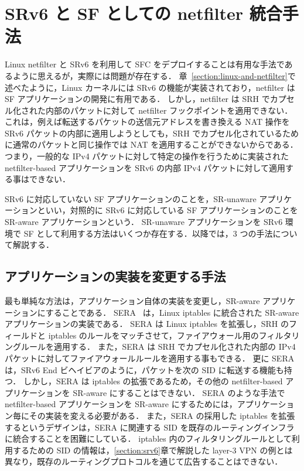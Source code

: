 \section{SRv6 と SF としての netfilter 統合手法}
\label{section:netfilter-as-nf}
Linux netfilter と SRv6 を利用して SFC をデプロイすることは有用な手法であるように思えるが，実際には問題が存在する．
章~\ref*{section:linux-and-netfilter}で述べたように，Linux カーネルには SRv6 の機能が実装されており，netfilter は SF アプリケーションの開発に有用である．
しかし，netfilter は SRH でカプセル化された内部のパケットに対して netfilter フックポイントを適用できない．
これは，例えば転送するパケットの送信元アドレスを書き換える NAT 操作を SRv6 パケットの内部に適用しようとしても，SRH でカプセル化されているために通常のパケットと同じ操作では NAT を適用することができないからである．
つまり，一般的な IPv4 パケットに対して特定の操作を行うために実装された netfilter-based アプリケーションを SRv6 の内部 IPv4 パケットに対して適用する事はできない．

SRv6 に対応していない SF アプリケーションのことを，SR-unaware アプリケーションといい，対照的に SRv6 に対応している SF アプリケーションのことを SR-aware アプリケーションという．
SR-unaware アプリケーションを SRv6 環境で SF として利用する方法はいくつか存在する．以降では，3 つの手法について解説する．

\subsection*{アプリケーションの実装を変更する手法}
\label{sbsection:change-impl}
最も単純な方法は，アプリケーション自体の実装を変更し，SR-aware アプリケーションにすることである．
SERA~\cite{sera} は，Linux iptables に統合された SR-aware アプリケーションの実装である．
SERA は Linux iptables を拡張し，SRH のフィールドと iptables のルールをマッチさせて，ファイアウォール用のフィルタリングルールを適用する．
また，SERA は SRH でカプセル化された内部の IPv4 パケットに対してファイアウォールルールを適用する事もできる．
更に SERA は，SRv6 End ビヘイビアのように，パケットを次の SID に転送する機能も持つ．
しかし，SERA は iptables の拡張であるため，その他の netfilter-based アプリケーションを SR-aware にすることはできない．
SERA のような手法で netfilter-based アプリケーションを SR-aware にするためには，アプリケーション毎にその実装を変える必要がある．
また，SERA の採用した iptables を拡張するというデザインは，SERA に関連する SID を既存のルーティングインフラに統合することを困難にしている．
iptables 内のフィルタリングルールとして利用するための SID の情報は，\ref*{section:srv6}章で解説した layer-3 VPN の例とは異なり，既存のルーティングプロトコルを通じて広告することはできない．

